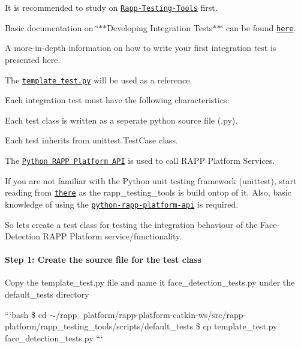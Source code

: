 It is recommended to study on \href{https://github.com/rapp-project/rapp-platform/wiki/RAPP-Testing-Tools}{\tt Rapp-\/\-Testing-\/\-Tools} first.

Basic documentation on \char`\"{}$\ast$$\ast$\-Developing Integration Tests$\ast$$\ast$\char`\"{} can be found \href{https://github.com/rapp-project/rapp-platform/tree/master/rapp_testing_tools}{\tt here}.

A more-\/in-\/depth information on how to write your first integration test is presented here.

The \href{https://github.com/rapp-project/rapp-platform/blob/master/rapp_testing_tools/scripts/default_tests/template_test.py}{\tt template\-\_\-test.\-py} will be used as a reference.

Each integration test must have the following characteristics\-:


\begin{DoxyItemize}
\item Each test class is written as a seperate python source file (.py).
\item Each test inherits from {\ttfamily unittest.\-Test\-Case} class.
\item The \href{https://github.com/rapp-project/rapp-api/tree/master/python}{\tt Python R\-A\-P\-P Platform A\-P\-I} is used to call R\-A\-P\-P Platform Services.
\end{DoxyItemize}

If you are not familiar with the Python unit testing framework (unittest), start reading from \href{https://docs.python.org/2.7/library/unittest.html}{\tt there} as the rapp\-\_\-testing\-\_\-tools is build ontop of it. Also, basic knowledge of using the \href{https://github.com/rapp-project/rapp-api/tree/master/python}{\tt python-\/rapp-\/platform-\/api} is required.

So lets create a test class for testing the integration behaviour of the Face-\/\-Detection R\-A\-P\-P Platform service/functionality.

\paragraph*{Step 1\-: Create the source file for the test class}

Copy the {\ttfamily template\-\_\-test.\-py} file and name it {\ttfamily face\-\_\-detection\-\_\-tests.\-py} under the {\ttfamily default\-\_\-tests} directory

```bash \$ cd $\sim$/rapp\-\_\-platform/rapp-\/platform-\/catkin-\/ws/src/rapp-\/platform/rapp\-\_\-testing\-\_\-tools/scripts/default\-\_\-tests \$ cp template\-\_\-test.\-py face\-\_\-detection\-\_\-tests.\-py ```

